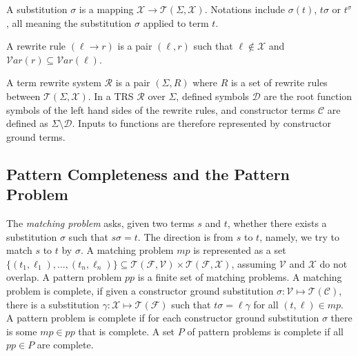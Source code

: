 A substitution $\sigma$ is a mapping $\mathcal{X} \rightarrow \mathcal{T}(\Sigma, \mathcal{X})$. Notations include $\sigma(t)$, $t\sigma$ or $t^\sigma$, all meaning the substitution $\sigma$ applied to term $t$. 

A rewrite rule $(\ell \rightarrow r)$ is a pair $(\ell, r)$ such that $\ell \notin \mathcal{X}$ and $\mathcal{V}ar(r) \subseteq \mathcal{V}ar(\ell)$.

A term rewrite system $\mathcal{R}$ is a pair $(\Sigma, R)$ where $R$ is a set of rewrite rules between $\mathcal{T}(\Sigma, \mathcal{X})$. In a TRS $\mathcal{R}$ over $\Sigma$, defined symbols $\mathcal{D}$ are the root function symbols of the left hand sides of the rewrite rules, and constructor terms $\mathcal{C}$ are defined as $\Sigma \setminus \mathcal{D}$. Inputs to functions are therefore represented by constructor ground terms.


\subsection{Pattern Completeness and the Pattern Problem} \label{def-pattern-complete}
The \textit{matching problem} asks, given two terms $s$ and $t$, whether there exists a substitution $\sigma$ such that $s\sigma = t$. The direction is from $s$ to $t$, namely, we try to match $s$ to $t$ by $\sigma$. A matching problem $mp$ is represented as a set $\{(t_1, \ell_1), ..., (t_n, \ell_n)\} \subseteq \mathcal{T}(\mathcal{F}, \mathcal{V}) \times \mathcal{T}(\mathcal{F}, \mathcal{X})$, assuming $\mathcal{V}$ and $\mathcal{X}$ do not overlap. A pattern problem $pp$ is a finite set of matching problems. A matching problem is complete, if given a constructor ground substitution $\sigma : \mathcal{V} \mapsto \mathcal{T}(\mathcal{C})$, there is a substitution $\gamma : \mathcal{X} \mapsto \mathcal{T}(\mathcal{F})$ such that $t\sigma = \ell\gamma$ for all $(t, \ell) \in mp$. A pattern problem is complete if for each constructor ground substitution $\sigma$ there is some $mp \in pp$ that is complete. A set $P$ of pattern problems is complete if all $pp \in P$ are complete. 

